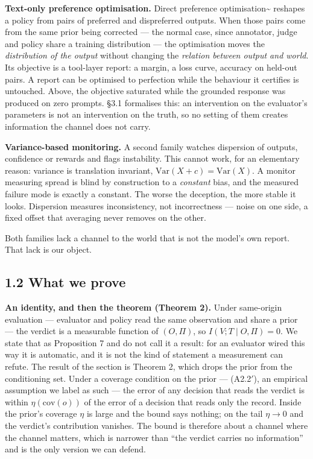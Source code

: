 \documentclass[11pt,a4paper]{article}
\begin{document}
\textbf{Text-only preference optimisation.} Direct preference
optimisation\textasciitilde{}\cite{rafailov2023dpo} reshapes a policy from pairs of preferred and
dispreferred outputs. When those pairs come
from the same prior being corrected --- the normal case, since annotator, judge and
policy share a training distribution --- the optimisation moves the \emph{distribution
of the output} without changing the \emph{relation between output and world}. Its
objective is a tool-layer report: a margin, a loss curve, accuracy on held-out
pairs. A report can be optimised to perfection while the behaviour it certifies
is untouched. Above, the objective saturated while the grounded response was
produced on zero prompts. §3.1 formalises this: an intervention on the
evaluator's parameters is not an intervention on the truth, so no setting of them
creates information the channel does not carry.

\textbf{Variance-based monitoring.} A second family watches dispersion of outputs,
confidence or rewards and flags instability. This cannot work, for an elementary
reason: variance is translation invariant, \(\mathrm{Var}(X+c)=\mathrm{Var}(X)\).
A monitor measuring spread is blind by construction to a \emph{constant} bias, and the
measured failure mode is exactly a constant. The worse the deception, the more
stable it looks. Dispersion measures inconsistency, not incorrectness --- noise on
one side, a fixed offset that averaging never removes on the other.

Both families lack a channel to the world that is not the model's own report.
That lack is our object.

\subsection{1.2 What we prove}\label{what-we-prove}

\textbf{An identity, and then the theorem (Theorem 2).} Under same-origin evaluation ---
evaluator and policy read the same observation and share a prior --- the verdict is a
measurable function of \((O,\Pi)\), so \(I(V;T\mid O,\Pi)=0\). We state that as
Proposition 7 and do not call it a result: for an evaluator wired this way it is
automatic, and it is not the kind of statement a measurement can refute. The result
of the section is Theorem 2, which drops the prior from the conditioning set. Under
a coverage condition on the prior --- (A2.2\('\)), an empirical assumption we label as
such --- the error of any decision that reads the verdict is within
\(\eta(\mathrm{cov}(o))\) of the error of a decision that reads only the record.
Inside the prior's coverage \(\eta\) is large and the bound says nothing; on the tail
\(\eta\to0\) and the verdict's contribution vanishes. The bound is therefore about a
channel where the channel matters, which is narrower than ``the verdict carries no
information'' and is the only version we can defend.
\end{document}
